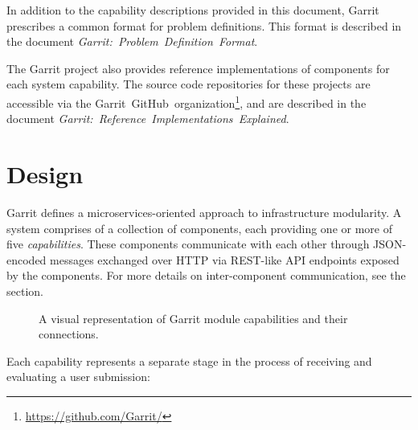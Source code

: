 \documentclass[11pt,letterpaper]{article}
\begin{document}
In addition to the capability descriptions provided in this document, Garrit
prescribes a common format for problem definitions. This format is described in
the document \emph{Garrit:~Problem~Definition~Format}.

The Garrit project also provides reference implementations of components for
each system capability. The source code repositories for these projects are
accessible via the
Garrit~GitHub~organization\footnote{\url{https://github.com/Garrit/}}, and are
described in the document \emph{Garrit:~Reference~Implementations~Explained}.

\section{Design}
\label{design}

Garrit defines a microservices-oriented approach to infrastructure modularity.
A system comprises of a collection of components, each providing one or more of
five \emph{capabilities}. These components communicate with each other through
JSON-encoded messages exchanged over HTTP via REST-like API endpoints exposed
by the components. For more details on inter-component communication, see the
 section.

\begin{figure}[h]
\centering
{}
\caption{A visual representation of Garrit module capabilities and their
connections.}
\end{figure}

Each capability represents a separate stage in the process of receiving and
evaluating a user submission:
\end{document}
